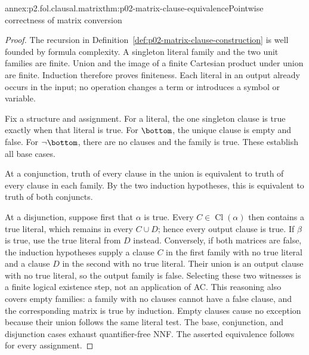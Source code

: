 \begin{annexitem}{annex:p2.fol.clausal.matrix}{thm:p02-matrix-clause-equivalence}{Pointwise correctness of matrix conversion}
\begin{proof}
The recursion in Definition~\ref{def:p02-matrix-clause-construction}
is well founded by formula complexity.  A singleton literal family and
the two unit families are finite.  Union and the image of a finite
Cartesian product under union are finite.  Induction therefore proves
finiteness.  Each literal in an output already occurs in the input;
no operation changes a term or introduces a symbol or variable.

Fix a structure and assignment.  For a literal, the one singleton clause
is true exactly when that literal is true.  For \(\bottom\), the
unique clause is empty and false.  For \(\neg\bottom\), there are
no clauses and the family is true.  These establish all base cases.

At a conjunction, truth of every clause in the union is equivalent to
truth of every clause in each family.  By the two induction hypotheses,
this is equivalent to truth of both conjuncts.

At a disjunction, suppose first that \(\alpha\) is true.  Every
\(C\in\operatorname{Cl}(\alpha)\) then contains a true literal,
which remains in every \(C\cup D\); hence every output clause is
true.  If \(\beta\) is true, use the true literal from \(D\)
instead.  Conversely, if both matrices are false, the induction
hypotheses supply a clause \(C\) in the first family with no true
literal and a clause \(D\) in the second with no true literal.
Their union is an output clause with no true literal, so the output
family is false.  Selecting these two witnesses is a finite logical
existence step, not an application of AC.  This reasoning also covers
empty families: a family with no clauses cannot have a false clause,
and the corresponding matrix is true by induction.  Empty clauses
cause no exception because their union follows the same literal test.
The base, conjunction, and disjunction cases exhaust quantifier-free
NNF.  The asserted equivalence follows for every assignment.
\end{proof}
\end{annexitem}

